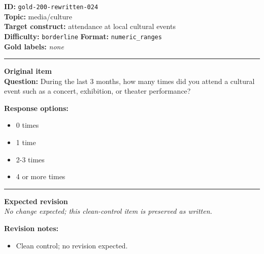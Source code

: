\documentclass[10pt,a4paper]{article}
\newcommand{\sectionline}{\vspace{0.15em}\hrule\vspace{0.35em}}
\begin{document}
\begin{tcolorbox}[colframe=CleanGreen,colback=white,colbacktitle=CleanGreen!9,coltitle=black,title={Item 024\hfill Clean control}]
\textbf{ID:} \texttt{gold-200-rewritten-024}\\
\textbf{Topic:} media/culture\\
\textbf{Target construct:} attendance at local cultural events\\
\textbf{Difficulty:} \texttt{borderline} \quad \textbf{Format:} \texttt{numeric\_ranges}\\
\textbf{Gold labels:} \textit{none}\\
\sectionline
\textbf{Original item}\\
\textbf{Question:} During the last 3 months, how many times did you attend a cultural event such as a concert, exhibition, or theater performance?
\par\textbf{Response options:}
\begin{itemize}
\item 0 times
\item 1 time
\item 2-3 times
\item 4 or more times
\end{itemize}
\sectionline
\textbf{Expected revision}\\
\textit{No change expected; this clean-control item is preserved as written.}
\par\textbf{Revision notes:}
\begin{itemize}
\item Clean control; no revision expected.
\end{itemize}
\end{tcolorbox}
\end{document}

